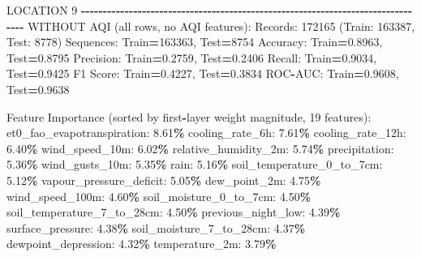 \documentclass[
  letterpaper,
  DIV=11,
  numbers=noendperiod]{scrartcl}
\newenvironment{Shaded}{\begin{snugshade}}{\end{snugshade}}
\newcommand{\BuiltInTok}[1]{#1}
\newcommand{\DecValTok}[1]{\textcolor[rgb]{0.00,0.00,0.81}{#1}}
\newcommand{\FloatTok}[1]{\textcolor[rgb]{0.00,0.00,0.81}{#1}}
\newcommand{\NormalTok}[1]{#1}
\newcommand{\OperatorTok}[1]{\textcolor[rgb]{0.81,0.36,0.00}{\textbf{#1}}}
\begin{document}
\begin{Shaded}
\begin{Highlighting}[]
\NormalTok{LOCATION }\DecValTok{9}
\OperatorTok{{-}{-}{-}{-}{-}{-}{-}{-}{-}{-}{-}{-}{-}{-}{-}{-}{-}{-}{-}{-}{-}{-}{-}{-}{-}{-}{-}{-}{-}{-}{-}{-}{-}{-}{-}{-}{-}{-}{-}{-}{-}{-}{-}{-}{-}{-}{-}{-}{-}{-}{-}{-}{-}{-}{-}{-}{-}{-}{-}{-}{-}{-}{-}{-}{-}{-}{-}{-}{-}{-}{-}{-}{-}{-}{-}{-}{-}{-}{-}{-}}
\NormalTok{WITHOUT AQI (}\BuiltInTok{all}\NormalTok{ rows, no AQI features):}
\NormalTok{  Records: }\DecValTok{172165}\NormalTok{ (Train: }\DecValTok{163387}\NormalTok{, Test: }\DecValTok{8778}\NormalTok{)}
\NormalTok{  Sequences: Train}\OperatorTok{=}\DecValTok{163363}\NormalTok{, Test}\OperatorTok{=}\DecValTok{8754}
\NormalTok{  Accuracy: Train}\OperatorTok{=}\FloatTok{0.8963}\NormalTok{, Test}\OperatorTok{=}\FloatTok{0.8795}
\NormalTok{  Precision: Train}\OperatorTok{=}\FloatTok{0.2759}\NormalTok{, Test}\OperatorTok{=}\FloatTok{0.2406}
\NormalTok{  Recall: Train}\OperatorTok{=}\FloatTok{0.9034}\NormalTok{, Test}\OperatorTok{=}\FloatTok{0.9425}
\NormalTok{  F1 Score: Train}\OperatorTok{=}\FloatTok{0.4227}\NormalTok{, Test}\OperatorTok{=}\FloatTok{0.3834}
\NormalTok{  ROC}\OperatorTok{{-}}\NormalTok{AUC: Train}\OperatorTok{=}\FloatTok{0.9608}\NormalTok{, Test}\OperatorTok{=}\FloatTok{0.9638}

\NormalTok{  Feature Importance (}\BuiltInTok{sorted}\NormalTok{ by first}\OperatorTok{{-}}\NormalTok{layer weight magnitude, }\DecValTok{19}\NormalTok{ features):}
\NormalTok{    et0\_fao\_evapotranspiration: }\FloatTok{8.61}\OperatorTok{\%}
\NormalTok{    cooling\_rate\_6h: }\FloatTok{7.61}\OperatorTok{\%}
\NormalTok{    cooling\_rate\_12h: }\FloatTok{6.40}\OperatorTok{\%}
\NormalTok{    wind\_speed\_10m: }\FloatTok{6.02}\OperatorTok{\%}
\NormalTok{    relative\_humidity\_2m: }\FloatTok{5.74}\OperatorTok{\%}
\NormalTok{    precipitation: }\FloatTok{5.36}\OperatorTok{\%}
\NormalTok{    wind\_gusts\_10m: }\FloatTok{5.35}\OperatorTok{\%}
\NormalTok{    rain: }\FloatTok{5.16}\OperatorTok{\%}
\NormalTok{    soil\_temperature\_0\_to\_7cm: }\FloatTok{5.12}\OperatorTok{\%}
\NormalTok{    vapour\_pressure\_deficit: }\FloatTok{5.05}\OperatorTok{\%}
\NormalTok{    dew\_point\_2m: }\FloatTok{4.75}\OperatorTok{\%}
\NormalTok{    wind\_speed\_100m: }\FloatTok{4.60}\OperatorTok{\%}
\NormalTok{    soil\_moisture\_0\_to\_7cm: }\FloatTok{4.50}\OperatorTok{\%}
\NormalTok{    soil\_temperature\_7\_to\_28cm: }\FloatTok{4.50}\OperatorTok{\%}
\NormalTok{    previous\_night\_low: }\FloatTok{4.39}\OperatorTok{\%}
\NormalTok{    surface\_pressure: }\FloatTok{4.38}\OperatorTok{\%}
\NormalTok{    soil\_moisture\_7\_to\_28cm: }\FloatTok{4.37}\OperatorTok{\%}
\NormalTok{    dewpoint\_depression: }\FloatTok{4.32}\OperatorTok{\%}
\NormalTok{    temperature\_2m: }\FloatTok{3.79}\OperatorTok{\%}


\end{Highlighting}
\end{Shaded}
\end{document}

